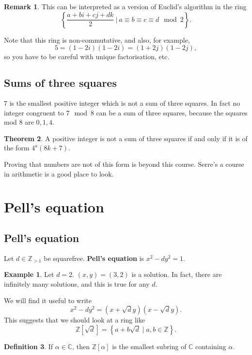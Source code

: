 \documentclass{article}
\newcommand{\Z}{\mathbb{Z}}
\newcommand{\C}{\mathbb{C}}
\newcommand{\rb}[1]{\left( #1 \right)}
\renewcommand{\sb}[1]{\left[ #1 \right]}
\newcommand{\cb}[1]{\left\{ #1 \right\}}
\theoremstyle{definition}\newtheorem{definition}{Definition}
\theoremstyle{definition}\newtheorem{remark}[definition]{Remark}
\theoremstyle{definition}\newtheorem*{example}{Example}
\theoremstyle{definition}\newtheorem*{note}{Note}
\newtheorem{theorem}[definition]{Theorem}
\begin{document}
\begin{remark}
This can be interpreted as a version of Euclid's algorithm in the ring
$$ \cb{\dfrac{a + bi + cj + dk}{2} \ \Bigg| \ a \equiv b \equiv c \equiv d \mod 2}. $$
\end{remark}

Note that this ring is non-commutative, and also, for example,
$$ 5 = \rb{1 - 2i}\rb{1 - 2i} = \rb{1 + 2j}\rb{1 - 2j}, $$
so you have to be careful with unique factorisation, etc.

\subsection{Sums of three squares}

$ 7 $ is the smallest positive integer which is not a sum of three squares. In fact no integer congruent to $ 7 \mod 8 $ can be a sum of three squares, because the squares mod $ 8 $ are $ 0, 1, 4 $.

\begin{theorem}
A positive integer is not a sum of three squares if and only if it is of the form $ 4^a\rb{8k + 7} $.
\end{theorem}

Proving that numbers are not of this form is beyond this course. Serre's a course in arithmetic is a good place to look.

\pagebreak

\section{Pell's equation}

\subsection{Pell's equation}

Let $ d \in \Z_{> 1} $ be squarefree. \textbf{Pell's equation} is $ x^2 - dy^2 = 1 $.

\begin{example}
Let $ d = 2 $. $ \rb{x, y} = \rb{3, 2} $ is a solution. In fact, there are infinitely many solutions, and this is true for any $ d $.
\end{example}

We will find it useful to write
$$ x^2 - dy^2 = \rb{x + \sqrt{d}y}\rb{x - \sqrt{d}y}. $$
This suggests that we should look at a ring like
$$ \Z\sb{\sqrt{d}} = \cb{a + b\sqrt{d} \mid a, b \in \Z}. $$

\begin{definition}
If $ \alpha \in \C $, then $ \Z\sb{\alpha} $ is the smallest subring of $ \C $ containing $ \alpha $.
\end{definition}
\end{document}
